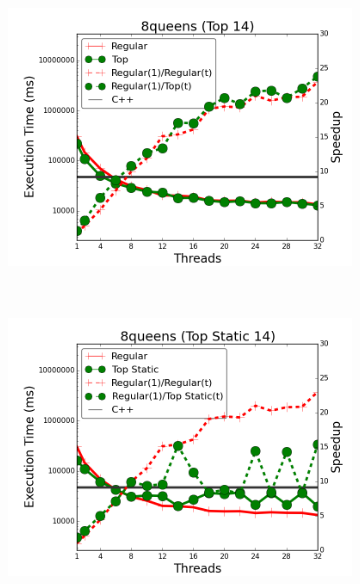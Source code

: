 \begin{figure}[]
        \centering
        \begin{subfigure}[b]{\plotsize\textwidth}
           \includegraphics[width=\textwidth]{experiments/coordination/cmp-top-8queens-14.png}
           \mycap{}
           \label{fig:coordination:coord_14queenstop}
        \end{subfigure}
        ~
        \begin{subfigure}[b]{\plotsize\textwidth}
           \includegraphics[width=\textwidth]{experiments/coordination/cmp-top-static-8queens-14.png}
           \mycap{}
           \label{fig:coordination:coord_14queenstopstatic}
        \end{subfigure} \\

\end{figure}

